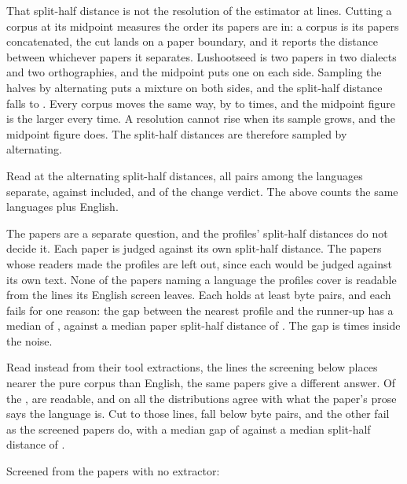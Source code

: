 That split-half distance is not the resolution of the estimator at \GoldUnreadWiderLines{} lines. Cutting a corpus at its midpoint measures the order its papers are in: a corpus is its papers concatenated, the cut lands on a paper boundary, and it reports the distance between whichever papers it separates. Lushootseed is two papers in two dialects and two orthographies, and the midpoint puts one on each side. Sampling the halves by alternating puts a mixture on both sides, and the split-half distance falls to \GoldUnreadAlternating{}. Every corpus moves the same way, by \GoldRatioLeast{} to \GoldRatioMost{} times, and the midpoint figure is the larger every time. A resolution cannot rise when its sample grows, and the midpoint figure does. The split-half distances are therefore sampled by alternating.

Read at the alternating split-half distances, all \GoldLanguagePairs{} pairs among the \GoldLanguages{} languages separate, \GoldUnreadLeft{} against \GoldUnreadRight{} included, and \GoldLanguagePairsChanged{} of the \GoldLanguagePairs{} change verdict. The \GoldPairs{} above counts the same \GoldLanguages{} languages plus English.

The papers are a separate question, and the profiles' split-half distances do not decide it. Each paper is judged against its own split-half distance. The \ReaderPapers{} papers whose readers made the profiles are left out, since each would be judged against its own text. None of the \GoldPapers{} papers naming a language the profiles cover is readable from the lines its English screen leaves. Each holds at least \GoldPapersLeast{} byte pairs, and each fails for one reason: the gap between the nearest profile and the runner-up has a median of \GoldMedianGap{}, against a median paper split-half distance of \GoldMedianSplit{}. The gap is \GoldNoiseTimes{} times inside the noise.

Read instead from their tool extractions, the lines the screening below places nearer the pure corpus than English, the same papers give a different answer. Of the \SiftedPapers{}, \SiftedPapersRead{} are readable, and on all \SiftedPapersAgreed{} the distributions agree with what the paper's prose says the language is. Cut to those lines, \SiftedPapersSmall{} fall below \GoldPapersLeast{} byte pairs, and the other \SiftedPapersUnread{} fail as the screened papers do, with a median gap of \SiftedMedianGap{} against a median split-half distance of \SiftedMedianSplit{}.

Screened from the papers with no extractor:

